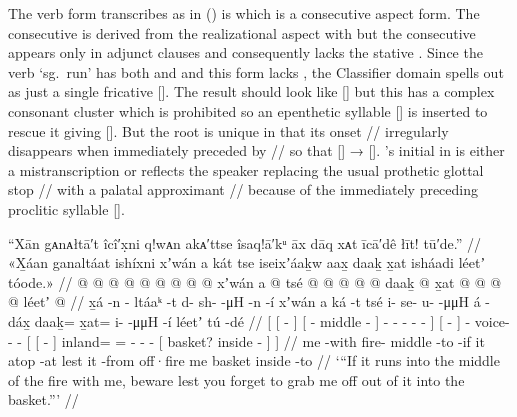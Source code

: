 The verb form \citeauthor{swanton:1909} transcribes as  in (\lastx) is  which is a consecutive aspect form.
The consecutive is derived from the realizational aspect with  but the consecutive appears only in adjunct clauses and consequently lacks the stative .
Since the verb  ‘sg.\ run’ has both  and  and this form lacks , the Classifier domain spells out as just a single fricative  [].
The result should look like  [] but this has a complex consonant cluster which is prohibited so an epenthetic syllable  [] is inserted to rescue it giving  [].
But the root  is unique in that its onset // irregularly disappears when immediately preceded by // so that  [] →  [].
\citeauthor{swanton:1909}’s initial  in  is either a mistranscription or reflects the speaker replacing the usual prothetic glottal stop // with a palatal approximant // because of the immediately preceding proclitic syllable  [].

\ex\label{ex:91-87-lest-forget-run-in-grab-out}%
%
\begingl
	\glpreamble	“Xān gᴀnᴀłtā′t îcî′x̣ni q!wᴀn akᴀ′ttse îsaq!ā′kᵘ āx dāq xᴀt īcā′dê łīt! tū′de.” //
	\glpreamble	«\!X̱áan ganaltáat ishíxni xʼwán a kát tse iseixʼáaḵw aax̱ daaḵ x̱at isháadi léetʼ tóode.\!» //
	\gla	{} {}  @ {} {} 
			{}  @ {} @ {} {}
			 @ {} @ {} @ {} @ {} @ {} @ {} {}
		xʼwán
		{} a  @ {} {}
		tsé
		 @ {} @ {} @ {} @ {}
		{} {}  @ {} {}
			daaḵ @ x̱at @  @ {} @ {} @ {}
			{} léetʼ  @ {} {} {} //
	\glb	{} {} x̱á -n {}
			{} - ltáaᵏ -t {}
			{} d- sh-  -μH -n -í {}
		xʼwán
		{} a ká -t {}
		tsé
		i- se- u-  -μμH
		{} {} á -dáx̱ {}
			daaḵ= x̱at= i-  -μμH -í
			{} léetʼ tú -dé {} {} //
	\glc	{}[ {}[  - {}]
			{}[ - middle - {}]
			\· - -  - - - {}]
		{}[   - {}]
		- voice- -  -
		{}[ {}[  - {}]
			inland= = -  - -
			{}[ basket? inside - {}] {}] //
	\gld	{} {} me -with {}
		{} fire- middle -to {}
		 {} {} {} {} {} -if {}
		{} it atop -at {}
		lest
		 {} {} {} {}
		{} {} it -from {}
			off·fire\• me\•  {} {} {}
			{} basket inside -to {} {} //
	\glft	‘“If it runs into the middle of the fire with me, beware lest you forget to grab me off out of it into the basket.”’
		//
\endgl
\xe

